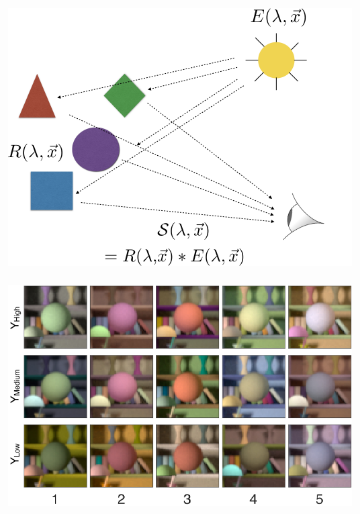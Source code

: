 \documentclass{jov}
\begin{document}
\begin{figure}[h]
\centering
\begin{subfigure}{0.4 \textwidth}
		\centering
        \includegraphics[width=\textwidth]{../Figures/Figure1/Figure1_a.png}
        \caption{}
        \label{fig:introSchematic}
    \end{subfigure}
    \begin{subfigure}{0.45 \textwidth}   
        \includegraphics[width=\textwidth]{../Figures/Figure1/Figure1_b.jpeg}
        \caption{}
        \label{fig:introExampleFigure}
    \end{subfigure}
    \label{introFigure}

\end{figure}
\end{document}

